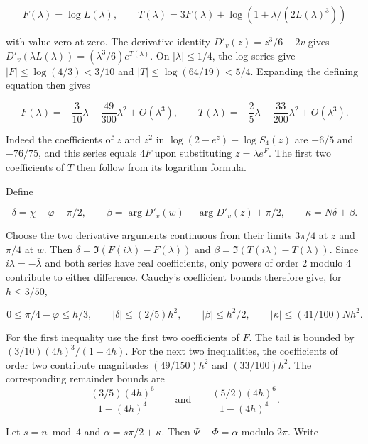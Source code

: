 \documentclass[11pt]{article}
\begin{document}
\begin{equation*}
F(\lambda)=\log L(\lambda),\qquad
T(\lambda)=3F(\lambda)+\log(1+\lambda/(2L(\lambda)^3))
\end{equation*}

with value zero at zero. The derivative identity $D'_v(z)=z^3/6-2v$ gives $D'_v(\lambda L(\lambda))=(\lambda^3/6)e^{T(\lambda)}$. On $|\lambda|\le1/4$, the log series give $|F|\le\log(4/3)<3/10$ and $|T|\le\log(64/19)<5/4$. Expanding the defining equation then gives

\begin{equation*}
F(\lambda)=-\frac3{10}\lambda-\frac{49}{300}\lambda^2+O(\lambda^3),
\qquad
T(\lambda)=-\frac25\lambda-\frac{33}{200}\lambda^2+O(\lambda^3).
\end{equation*}

Indeed the coefficients of $z$ and $z^2$ in $\log(2-e^z)-\log S_4(z)$ are $-6/5$ and $-76/75$, and this series equals $4F$ upon substituting $z=\lambda e^F$. The first two coefficients of $T$ then follow from its logarithm formula.

Define

\begin{equation*}
\delta=\chi-\varphi-\pi/2,\qquad
\beta=\arg D'_v(w)-\arg D'_v(z)+\pi/2,\qquad
\kappa=N\delta+\beta.
\end{equation*}

Choose the two derivative arguments continuous from their limits $3\pi/4$ at $z$ and $\pi/4$ at $w$. Then $\delta=\Im(F(i\lambda)-F(\lambda))$ and $\beta=\Im(T(i\lambda)-T(\lambda))$. Since $i\lambda=-\bar\lambda$ and both series have real coefficients, only powers of order $2$ modulo $4$ contribute to either difference. Cauchy's coefficient bounds therefore give, for $h\le3/50$,

\begin{equation}
0\le\pi/4-\varphi\le h/3,\qquad
|\delta|\le(2/5)h^2,\qquad
|\beta|\le h^2/2,\qquad
|\kappa|\le(41/100)Nh^2 .
\label{eq:phase-gaps}
\end{equation}

For the first inequality use the first two coefficients of $F$. The tail is bounded by $(3/10)(4h)^3/(1-4h)$. For the next two inequalities, the coefficients of order two contribute magnitudes $(49/150)h^2$ and $(33/100)h^2$. The corresponding remainder bounds are
\[
\frac{(3/5)(4h)^6}{1-(4h)^4}
\qquad\text{and}\qquad
\frac{(5/2)(4h)^6}{1-(4h)^4}.
\]

Let $s=n\bmod4$ and $\alpha=s\pi/2+\kappa$. Then $\Psi-\Phi=\alpha$ modulo $2\pi$. Write
\end{document}
